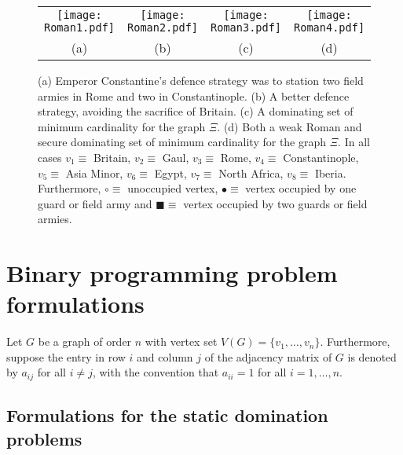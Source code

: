 \documentclass[10pt,a4paper]{article}
\begin{document}
\begin{figure}[tb]
 
\begin{center} 
\begin{tabular}{cccc}
		\texttt{[image: Roman1.pdf]}	&		\texttt{[image: Roman2.pdf]}&		\texttt{[image: Roman3.pdf]}&		\texttt{[image: Roman4.pdf]}	\\
		\footnotesize(a)	&	\footnotesize(b)&	\footnotesize(c)&	\footnotesize(d)\\
	\end{tabular}

\end{center}
 
 
\caption{(a) Emperor Constantine's defence strategy was to station two field armies in Rome and two in Constantinople. (b) A better defence strategy, avoiding the sacrifice of Britain. (c) A dominating set of minimum cardinality for the graph $\Xi$. (d) Both a weak Roman and secure dominating set of minimum cardinality for the graph $\Xi$. In all cases $v_1 \equiv$ Britain, $v_2 \equiv$ Gaul, $v_3 \equiv$ Rome, $v_4 \equiv$ Constantinople, $v_5 \equiv$ Asia Minor, $v_6 \equiv$ Egypt, $v_7 \equiv$ North Africa, $v_8 \equiv$ Iberia. Furthermore, $\circ \equiv$ unoccupied vertex, $\bullet \equiv$ vertex occupied by one guard or field army and $\blacksquare \equiv$ vertex occupied by two guards or field armies.} \label{deployments} \end{figure}





\section{Binary programming problem formulations}
Let $G$ be a graph of order $n$ with vertex set $V(G) = \{v_1,\ldots,v_n\}$. Furthermore, suppose the entry in row $i$ and column $j$ of the adjacency matrix of $G$ is denoted by $a_{ij}$ for all $i \neq j$, with the convention that $a_{ii}=1$ for all $i=1,\ldots,n$. 


\subsection{Formulations for the static domination problems}
\end{document}
